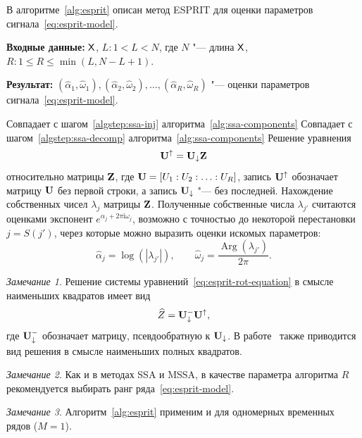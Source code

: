 \documentclass[specialist,
  substylefile = spbu.rtx,
subf,href,colorlinks=true, 12pt]{disser}
\theoremstyle{plain}
\theoremstyle{definition}
\theoremstyle{remark}
\newtheorem{remark}{Замечание}[section]
\newcommand{\Input}{\textbf{Входные данные: }}
\newcommand{\Output}{\textbf{Результат: }}
\newcommand{\iu}{\mathrm{i}}
\begin{document}
В алгоритме~\ref{alg:esprit} описан метод ESPRIT для оценки параметров
сигнала~\eqref{eq:esprit-model}.
\begin{algorithm}[!ht]
  \caption{ESPRIT для оценки параметров комплекснозначного сигнала.}
  \label{alg:esprit}
  \Input $\mathsf{X}$, $L: 1 < L < N$, где $N$ "--- длина $\mathsf{X}$, $R: 1
  \leqslant R\leqslant \min(L, N-L+1)$.

  \Output $\left(\widehat{\alpha}_1, \widehat{\omega}_1\right),
  \left(\widehat{\alpha}_2, \widehat{\omega}_2\right), \ldots,
  \left(\widehat{\alpha}_R, \widehat{\omega}_R\right)$ "--- оценки параметров
  сигнала~\eqref{eq:esprit-model}.
  \begin{algorithmic}[1]
    \State Совпадает с шагом~\ref{algstep:ssa-inj}
    алгоритма~\ref{alg:ssa-components}
    \State Совпадает с шагом~\ref{algstep:ssa-decomp}
    алгоритма~\ref{alg:ssa-components}
    \State Решение уравнения
    \begin{equation}\label{eq:esprit-rot-equation}
      \mathbf{U}^{\uparrow}=\mathbf{U}_{\downarrow}\mathbf{Z}
    \end{equation}
    относительно матрицы $\mathbf{Z}$, где $\mathbf{U} = [U_1:U_2:\ldots: U_R]$,
    запись $\mathbf{U}^{\uparrow}$ обозначает матрицу $\mathbf{U}$ без первой строки, а
    запись $\mathbf{U}_{\downarrow}$ "--- без последней.
    \State Нахождение собственных
    чисел $\lambda_j$ матрицы $\mathbf{Z}$.
    Полученные собственные числа $\lambda_{j'}$ считаются оценками
    экспонент $e^{\alpha_j + 2\pi\iu \omega_j}$, возможно с точностью
    до некоторой перестановки
    $j = S (j')$, через которые можно выразить
    оценки искомых параметров:
    \[
      \widehat{\alpha}_j = \log\left(\left|\lambda_{j'}\right|\right), \qquad
      \widehat{\omega}_j =
      \frac{\operatorname{Arg}\left(\lambda_{j'}\right)}{2 \pi}.
    \]
  \end{algorithmic}
\end{algorithm}
\begin{remark}\label{remark:esprit-ls-solution}
  Решение системы уравнений~\eqref{eq:esprit-rot-equation} в смысле
  наименьших квадратов имеет вид
  \[
    \widehat{Z} = \mathbf{U}_{\downarrow}^{-}\mathbf{U}^{\uparrow},
  \]
  где $\mathbf{U}_{\downarrow}^{-}$ обозначает матрицу, псевдообратную к
  $\mathbf{U}_{\downarrow}$. В работе~\cite{esprit2} также приводится вид
  решения в смысле наименьших полных квадратов.
\end{remark}
\begin{remark}
  Как и в методах SSA и MSSA, в качестве параметра алгоритма $R$
  рекомендуется выбирать ранг
  ряда~\eqref{eq:esprit-model}.
\end{remark}
\begin{remark}
  Алгоритм~\ref{alg:esprit} применим и для одномерных временных рядов ($M=1$).
\end{remark}
\end{document}
